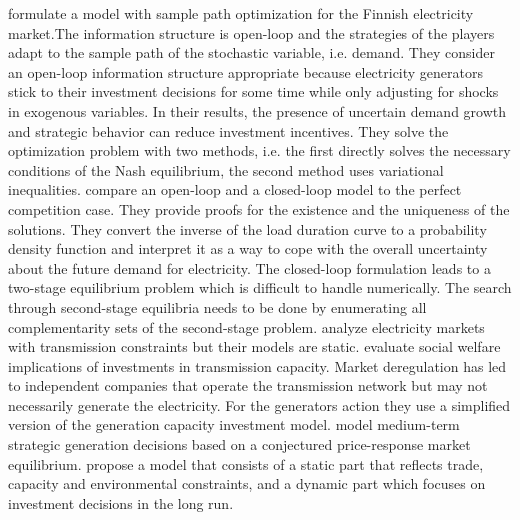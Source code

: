 \cite{Pineau2003} formulate a model with sample path optimization for the Finnish electricity market.The information structure is open-loop and the strategies of the players adapt to the sample path of the stochastic variable, i.e. demand. They consider an open-loop information structure appropriate because electricity generators stick to their investment decisions for some time while only adjusting for shocks in exogenous variables. In their results, the presence of uncertain demand growth and strategic behavior can reduce investment incentives. They solve the optimization problem with two methods, i.e. the first directly solves the necessary conditions of the Nash equilibrium, the second method uses variational inequalities. \cite{Murphy2005} compare an open-loop and a closed-loop model to the perfect competition case. They provide proofs for the existence and the uniqueness of the solutions. They convert the inverse of the load duration curve to a probability density function and interpret it as a way to cope with the overall uncertainty about the future demand for electricity. The closed-loop formulation leads to a two-stage equilibrium problem which is difficult to handle numerically. The search through second-stage equilibria needs to be done by enumerating all complementarity sets of the second-stage problem.
\cite{Neuhoff2005} analyze electricity markets with transmission constraints but their models are static. \cite{Sauma2006} evaluate social welfare implications of investments in transmission capacity. Market deregulation has led to independent companies that operate the transmission network but may not necessarily generate the electricity. For the generators action they use a simplified version of the \cite{Murphy2005} generation capacity investment model. \cite{Centeno2007} model medium-term strategic generation decisions based on a conjectured price-response market equilibrium. \cite{Lise2008} propose a model that consists of a static part that reflects trade, capacity and environmental constraints, and a dynamic part which focuses on investment decisions in the long run. 

